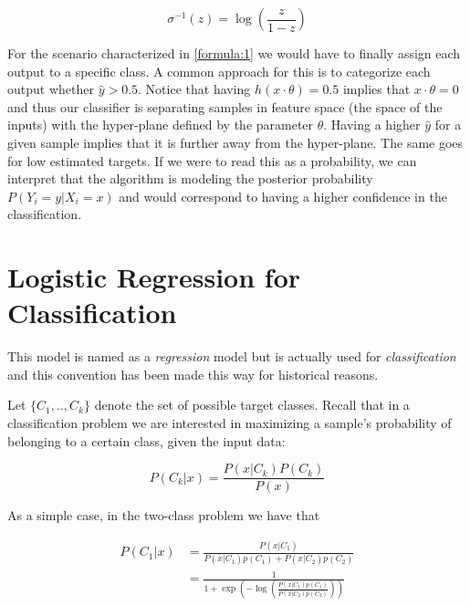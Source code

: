 \begin{equation}\label{eq:logitFunction}
\sigma^{-1}(z) = \log( \frac{z}{1 - z})
\end{equation}

For the scenario characterized in \cref{formula:1} we would have to finally assign each output to a specific class. A common approach for this is to categorize each output whether $\hat{y} > 0.5$\label{formula:logitThreshold}. Notice that having $h(x \cdot \theta) = 0.5$ implies that $x \cdot \theta = 0$ and thus our classifier is separating samples in feature space (the space of the inputs) with the hyper-plane defined by the parameter $\theta$. Having a higher $\hat{y}$ for a given sample implies that it is further away from the hyper-plane. The same goes for low estimated targets. If we were to read this as a probability, we can interpret that the algorithm is modeling the posterior probability $P(Y_i = y | X_i = x)$ and would correspond to having a higher confidence in the classification.




\section{Logistic Regression for Classification}\label{section-logisticRegression}

This model is named as a \textit{regression} model but is actually used for \textit{classification} and this convention has been made this way for historical reasons.


Let $\{C_1,..,C_k\}$ denote the set of possible target classes. Recall that in a classification problem we are interested in maximizing a sample's probability of belonging to a certain class, given the input data:

\begin{equation}
P(C_k| x) = \frac{P(x|C_k)P(C_k)}{P(x)}
\end{equation}

As a simple case, in the two-class problem we have that


\begin{equation}
\begin{split}
P(C_1| x) & = \frac{P(x|C_1) }{P(x|C_1)p(C_1) + P(x|C_2)p(C_2)} \\
& = \frac{1 }
{1 + \exp(- \log(  \frac{ P(x|C_1)p(C_1)}
{P(x|C_2)p(C_2)
}))
}
\end{split}
\end{equation}

